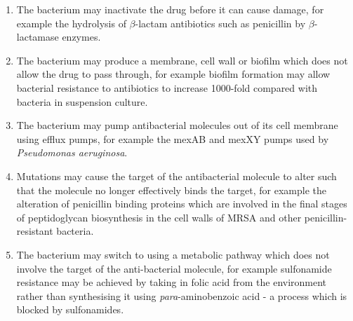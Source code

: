\begin{enumerate}
\item The bacterium may inactivate the drug before it can cause damage, for example the hydrolysis of $\beta$-lactam antibiotics such as penicillin by $\beta$-lactamase enzymes.

\item The bacterium may produce a membrane, cell wall or biofilm which does not allow the drug to pass through, for example biofilm formation may allow bacterial resistance to antibiotics to increase 1000-fold compared with bacteria in suspension culture\cite{Stewart2001}.

\item The bacterium may pump antibacterial molecules out of its cell membrane using efflux pumps, for example the mexAB and mexXY pumps used by \textit{Pseudomonas aeruginosa}\cite{Poole2004}.

\item Mutations may cause the target of the antibacterial molecule to alter such that the molecule no longer effectively binds the target, for example the alteration of penicillin binding proteins which are involved in the final stages of peptidoglycan biosynthesis in the cell walls of MRSA and other penicillin-resistant bacteria\cite{Fuda2004}.

\item The bacterium may switch to using a metabolic pathway which does not involve the target of the anti\hyp{}bacterial molecule, for example sulfonamide resistance may be achieved by taking in folic acid from the environment rather than synthesising it using \textit{para}-aminobenzoic acid - a process which is blocked by sulfonamides\cite{Skold2000}.

\end{enumerate}

